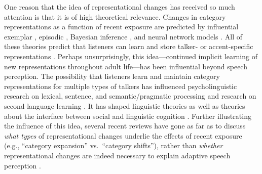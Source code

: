 \documentclass[
  11pt,
  man,floatsintext]{apa6}
\begin{document}
One reason that the idea of representational changes has received so much attention is that it is of high theoretical relevance. Changes in category representations as a function of recent exposure are predicted by influential exemplar \autocite{apfelbaum-mcmurray2015,johnson2006}, episodic \autocite{goldinger1998}, Bayesian inference \autocite{kleinschmidt-jaeger2015}, and neural network models \autocite{lancia-winter2013}. All of these theories predict that listeners can learn and store talker- or accent-specific representations \autocites[see also][]{bradlow-bent2008,baeseberk2013,tzeng2016}. Perhaps unsurprisingly, this idea---continued implicit learning of new representations throughout adult life---has been influential beyond speech perception. The possibility that listeners learn and maintain category representations for multiple types of talkers has influenced psycholinguistic research on lexical, sentence, and semantic/pragmatic processing \autocites{chang2012,fine2013,kaschak2004,pogue2016,prasad2021,ryskin2019,schuster-degen2020}[ for review, see][]{brown-schmidt2015} and research on second language learning \autocites[for reviews, see][]{kaan-chun2018,pajak2016}. It has shaped linguistic theories \autocites[e.g.,][]{bybee2001,goldinger-azuma2004,hay2019,magnuson-nusbaum2007,pierrehumbert2001} as well as theories about the interface between social and linguistic cognition \autocites[e.g.,][]{babel2019,creel-bregman2011,foulkes-hay2015,hanulikova2012,sumner2014}. Further illustrating the influence of this idea, several recent reviews have gone as far as to discuss \emph{what types} of representational changes underlie the effects of recent exposure (e.g., ``category expansion'' vs.~``category shifts''), rather than \emph{whether} representational changes are indeed necessary to explain adaptive speech perception \autocites[e.g.,][]{baeseberk2020,bent-baeseberk2021,schertz-clare2020}.
\end{document}
